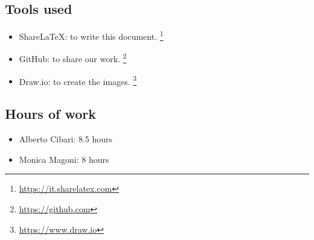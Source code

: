 \subsection*{Tools used}
    \begin{itemize}
        \item ShareLaTeX: to write this document.
        \footnote{\url{https://it.sharelatex.com}}
        \item GitHub: to share our work. \footnote{\url{https://github.com}} 
        \item Draw.io: to create the images.
        \footnote{\url{https://www.draw.io}}
    \end{itemize}
    
\subsection*{Hours of work}
    \begin{itemize}
    \item Alberto Cibari: 8.5 hours
    \item Monica Magoni: 8 hours
    \end{itemize}